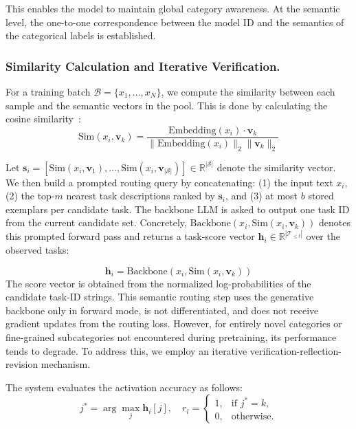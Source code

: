 \documentclass[11pt]{article}
\begin{document}
This enables the model to maintain global category awareness. At the semantic level, the one-to-one correspondence between the model ID and the semantics of the categorical labels is established.


\subsubsection{Similarity Calculation and Iterative Verification.}

For a training batch $\mathcal{B} = \{ x_1, \dots, x_N \}$, we compute the similarity between each sample and the semantic vectors in the pool. This is done by calculating the cosine similarity~\cite{lahitani2016cosine}:
\begin{equation}
    \text{Sim}(x_i, \mathbf{v}_k) = \frac{\text{Embedding}(x_i) \cdot \mathbf{v}_k}{\|\text{Embedding}(x_i)\|_2 \|\mathbf{v}_k\|_2} 
\end{equation}

Let $\mathbf{s}_i = [\text{Sim}(x_i,\mathbf{v}_1), \ldots, \text{Sim}(x_i,\mathbf{v}_{|\mathcal{S}|})] \in \mathbb{R}^{|\mathcal{S}|}$ denote the similarity vector. We then build a prompted routing query by concatenating: (1) the input text $x_i$, (2) the top-$m$ nearest task descriptions ranked by $\mathbf{s}_i$, and (3) at most $b$ stored exemplars per candidate task. The backbone LLM is asked to output one task ID from the current candidate set. Concretely, $\text{Backbone}(x_i,\text{Sim}(x_i,\mathbf{v}_k))$ denotes this prompted forward pass and returns a task-score vector $\mathbf{h}_{i} \in \mathbb{R}^{|\mathcal{T}_{\le t}|}$ over the observed tasks:

\begin{equation}
   \mathbf{h}_{i} = \text{Backbone}(x_i,\text{Sim}(x_i, \mathbf{v}_k)) 
\end{equation}
The score vector is obtained from the normalized log-probabilities of the candidate task-ID strings. This semantic routing step uses the generative backbone only in forward mode, is not differentiated, and does not receive gradient updates from the routing loss. However, for entirely novel categories or fine-grained subcategories not encountered during pretraining, its performance tends to degrade. To address this, we employ an iterative verification-reflection-revision mechanism.

The system evaluates the activation accuracy as follows:
\begin{equation}
j^* = \arg\max_j \textbf{h}_i[j], \quad r_i = 
\begin{cases} 
1, & \text{if } j^* = k, \\
0, & \text{otherwise.}
\end{cases}
\end{equation}
\end{document}
